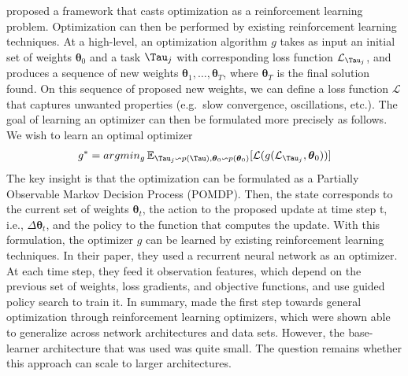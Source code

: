  proposed a framework that casts optimization as a reinforcement learning problem. Optimization can then be performed by existing reinforcement learning techniques. At a high-level, an optimization algorithm $g$ takes as input an initial set of weights $\boldsymbol{\theta}_{0}$ and a task $\Tau_{j}$ with corresponding loss function $\mathcal{L}_{\Tau_{j}}$, and produces a sequence of new weights $\boldsymbol{\theta}_{1},\ldots ,\boldsymbol{\theta}_{T}$, where $\boldsymbol{\theta}_{T}$ is the final solution found. On this sequence of proposed new weights, we can define a loss function $\mathcal{L}$ that captures unwanted properties (e.g.\ slow convergence, oscillations, etc.). 
The goal of learning an optimizer can then be formulated more precisely as follows. We wish to learn an optimal optimizer
\begin{align}
    g^{*} = argmin_{g} \, \mathbb{E}_{\Tau_{j} \backsim p(\Tau), \boldsymbol{\theta}_{0} \backsim p(\boldsymbol{\theta}_{0})}[\mathcal{L}( g(\mathcal{L}_{\Tau_{j}},\boldsymbol{\theta}_{0}))]
\end{align}
The key insight is that the optimization can be formulated as a Partially Observable Markov Decision Process (POMDP). Then, the state corresponds to the current set of weights $\boldsymbol{\theta}_{t}$, the action to the proposed update at time step t, i.e., $\Delta \boldsymbol{\theta}_{t}$, and the policy to the function that computes the update. With this formulation, the optimizer $g$ can be learned by existing reinforcement learning techniques. 
In their paper, they used a recurrent neural network as an optimizer. At each time step, they feed it observation features, which depend on the previous set of weights, loss gradients, and objective functions, and use guided policy search to train it.  
In summary,  made the first step towards general optimization through reinforcement learning optimizers, which were shown able to generalize across network architectures and data sets. However, the base-learner architecture that was used was quite small. The question remains whether this approach can scale to larger architectures.

